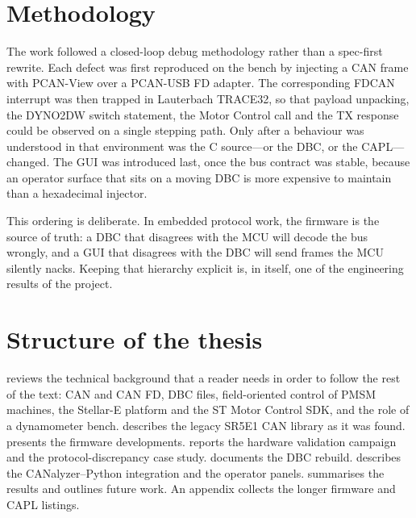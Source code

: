 \section{Methodology}
The work followed a closed-loop debug methodology rather than a
spec-first rewrite. Each defect was first reproduced on the bench by
injecting a CAN frame with PCAN-View over a PCAN-USB FD adapter. The
corresponding FDCAN interrupt was then trapped in Lauterbach TRACE32, so
that payload unpacking, the DYNO2DW switch statement, the Motor Control
call and the TX response could be observed on a single stepping path.
Only after a behaviour was understood in that environment was the C
source---or the DBC, or the CAPL---changed. The GUI was introduced last,
once the bus contract was stable, because an operator surface that sits on
a moving DBC is more expensive to maintain than a hexadecimal injector.

This ordering is deliberate. In embedded protocol work, the firmware is the
source of truth: a DBC that disagrees with the MCU will decode the bus
wrongly, and a GUI that disagrees with the DBC will send frames the MCU
silently nacks. Keeping that hierarchy explicit is, in itself, one of the
engineering results of the project.

\section{Structure of the thesis}
 reviews the technical background that a reader needs in order
to follow the rest of the text: CAN and CAN FD, DBC files, field-oriented
control of PMSM machines, the Stellar-E platform and the ST Motor Control
SDK, and the role of a dynamometer bench.  describes the
legacy SR5E1 CAN library as it was found.  presents the
firmware developments.  reports the hardware validation
campaign and the protocol-discrepancy case study.  documents
the DBC rebuild.  describes the CANalyzer--Python integration
and the operator panels.  summarises the results and outlines
future work. An appendix collects the longer firmware and CAPL listings.
